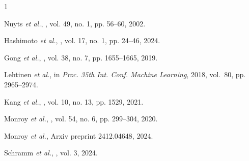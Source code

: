 \documentclass{IEEEtran}
\begin{document}
\begin{thebibliography}{1}

{Nuyts {\it et al.}},
, vol. 49, no. 1, pp. 56--60,
  2002.

{Hashimoto {\it et al.}},
, vol. 17, no. 1, pp. 24–46, 2024.

{Gong {\it et al.}},
, vol. 38, no. 7, pp. 1655–1665,
  2019.

{Lehtinen {\it et al.}},
\newblock in {\em Proc. 35th Int. Conf. Machine Learning}, 2018, vol.~80, pp.
  2965--2974.

{Kang {\it et al.}},
, vol. 10, no. 13, pp. 1529, 2021.

{Monroy {\it et al.}},
, vol. 54, no. 6, pp. 299–304, 2020.

{Monroy {\it et al.}},
\newblock Arxiv preprint 2412.04648, 2024.

{Schramm {\it et al.}},
, vol. 3, 2024.

\end{thebibliography}
\end{document}
